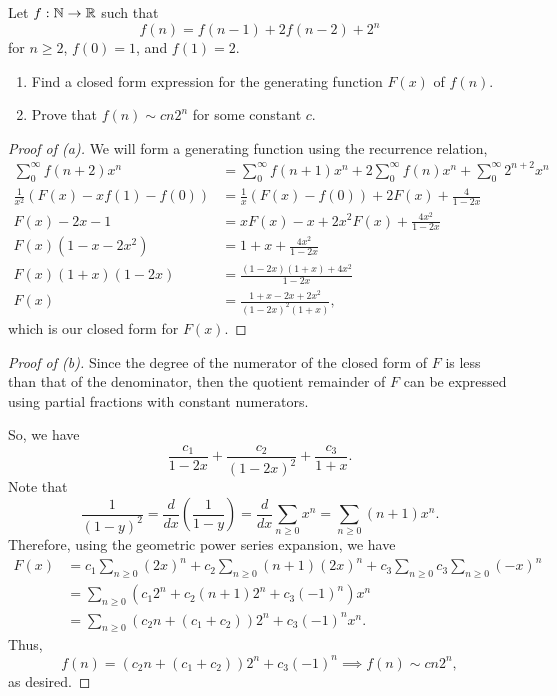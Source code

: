 \documentclass[../hw2]{subfiles}
\begin{document}
\begin{problem}
Let $f:\mathbb{N}\to \mathbb{R}$ such that \[
	f(n)=f(n-1)+2f(n-2)+2^n
\] for $n\ge 2$, $f(0)=1$, and $f(1)=2$.
\begin{enumerate}[label=(\alph*)]
	\item Find a closed form expression for the generating function $F(x)$ of $f(n)$.
	\item Prove that $f(n)\sim cn 2^n$ for some constant $c$.
\end{enumerate}
\end{problem}
\begin{proof}[Proof of (a)]
	We will form a generating function using the recurrence relation,
	\begin{align*}
		\sum_{0}^{\infty} f(n+2)x^n                 & = \sum_{0}^{\infty} f(n+1)x^n + 2 \sum_{0}^{\infty} f(n)x^n + \sum_{0}^{\infty} 2^{n+2}x^n \\
		\frac{1}{x^2}\left( F(x)-xf(1)-f(0) \right) & = \frac{1}{x}(F(x)-f(0))+2F(x)+\frac{4}{1-2x}                                              \\
		F(x)-2x-1                                   & = xF(x)-x+2x^2F(x)+\frac{4x^2}{1-2x}                                                       \\
		F(x)(1-x-2x^2)                              & =1+x+\frac{4x^2}{1-2x}                                                                     \\
		F(x)(1+x)(1-2x)                             & = \frac{(1-2x)(1+x)+4x^2}{1-2x}                                                            \\
		F(x)                                        & = \frac{1+x-2x+2x^2}{(1-2x)^2(1+x)}
		,\end{align*} which is our closed form for $F(x)$.
\end{proof}
\begin{proof}[Proof of (b)]
	Since the degree of the numerator of the closed form of $F$ is less than that of the denominator, then the quotient remainder of $F$ can be expressed using partial fractions with constant numerators.

	So, we have \[
		\frac{c_1}{1-2x}+\frac{c_2}{(1-2x)^2}+\frac{c_3}{1+x}
		.\]
	Note that \[
		\frac{1}{(1-y)^2}=\frac{d}{dx}\left( \frac{1}{1-y} \right) = \frac{d}{dx}\sum_{n\ge 0} x^n = \sum_{n\ge 0} (n+1)x^n
		.\]
	Therefore, using the geometric power series expansion, we have
	\begin{align*}
		F(x) & = c_1 \sum_{n\ge 0} (2x)^n + c_2 \sum_{n\ge 0} (n+1)(2x)^n + c_3 \sum_{n\ge 0} c_3 \sum_{n\ge 0} (-x)^n \\
		     & = \sum_{n\ge 0} \left( c_1 2^n + c_2(n+1) 2^n + c_3 (-1)^n \right) x^n                                  \\
		     & = \sum_{n\ge 0} (c_2n + (c_1+c_2))2^n + c_3(-1)^n x^n
		.\end{align*}
	Thus,  \[
		f(n)=(c_2n + (c_1+c_2))2^n + c_3(-1)^n \implies f(n) \sim cn 2^n
		,\] as desired.
\end{proof}
\end{document}

